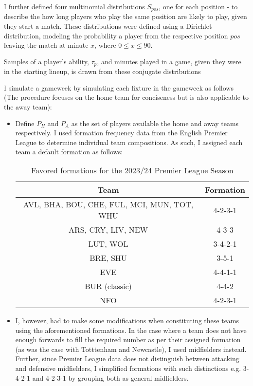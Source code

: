 I further defined four multinomial distributions $S_{pos}$, one for each position - to describe the how long players who play the same position are likely to play, given they start a match. These distributions were defined using a Dirichlet distribution, modeling the probability a player from the respective position $pos$ leaving the match at minute $x$, where $0 \le x \le 90$. 

Samples of a player's ability, $\tau_p$, and minutes played in a game, given they were in the starting lineup, is drawn from these conjugate distributions

I simulate a gameweek by simulating each fixture in the gameweek as follows (The procedure focuses on the home team for conciseness but is also applicable to the away team):
\begin{itemize}
    \item Define $P_H$ and $P_A$ as the set of players available the home and away teams respectively. I used formation frequency data from the English Premier League to determine individual team compositions. As such, I assigned each team a default formation as follows:
    \begin{table}[h!]
        \centering
        \begin{tabular}{|c|c|}
            \hline
            Team & Formation \\ \hline
            AVL, BHA, BOU, CHE, FUL, MCI, MUN, TOT, WHU & 4-2-3-1    \\ \hline
            ARS, CRY, LIV, NEW & 4-3-3  \\ \hline
            LUT, WOL & 3-4-2-1 \\ \hline
            BRE, SHU & 3-5-1 \\ \hline
            EVE & 4-4-1-1 \\ \hline
            BUR (classic) & 4-4-2 \\ \hline
            NFO & 4-2-3-1 \\ \hline
        \end{tabular}
        \caption{Favored formations for the 2023/24 Premier League Season}
        \label{tab:example_table}
    \end{table}
    \item I, however, had to make some modifications when constituting these teams using the aforementioned formations. In the case where a team does not have enough forwards to fill the required number as per their assigned formation (as was the case with Totttenham and Newcastle), I used midfielders instead. Further, since Premier League data does not distinguish between attacking and defensive midfielders, I simplified formations with such distinctions e.g. 3-4-2-1 and 4-2-3-1 by grouping both as general midfielders.

\end{itemize}
